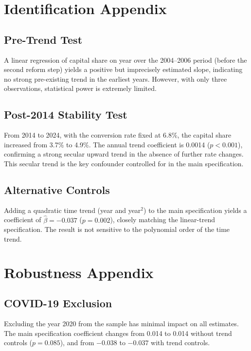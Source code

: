 \documentclass[12pt]{article}
\begin{document}
\section{Identification Appendix}
\label{app:identification}

\subsection{Pre-Trend Test}

A linear regression of capital share on year over the 2004--2006 period (before the second reform step) yields a positive but imprecisely estimated slope, indicating no strong pre-existing trend in the earliest years. However, with only three observations, statistical power is extremely limited.

\subsection{Post-2014 Stability Test}

From 2014 to 2024, with the conversion rate fixed at 6.8\%, the capital share increased from 3.7\% to 4.9\%. The annual trend coefficient is 0.0014 ($p < 0.001$), confirming a strong secular upward trend in the absence of further rate changes. This secular trend is the key confounder controlled for in the main specification.

\subsection{Alternative Controls}

Adding a quadratic time trend (year and year$^2$) to the main specification yields a coefficient of $\hat{\beta} = -0.037$ ($p = 0.002$), closely matching the linear-trend specification. The result is not sensitive to the polynomial order of the time trend.

\section{Robustness Appendix}
\label{app:robustness}

\subsection{COVID-19 Exclusion}

Excluding the year 2020 from the sample has minimal impact on all estimates. The main specification coefficient changes from 0.014 to 0.014 without trend controls ($p = 0.085$), and from $-0.038$ to $-0.037$ with trend controls.
\end{document}
